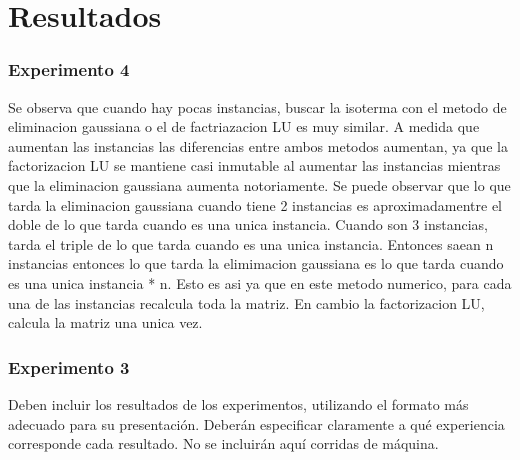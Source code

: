 \section{Resultados}
	
	
	


	\subsubsection*{Experimento 4}
	Se observa que cuando hay pocas instancias, buscar la isoterma con el metodo de eliminacion gaussiana o el de factriazacion LU es muy similar. A medida que aumentan las instancias las diferencias entre ambos metodos aumentan, ya que la factorizacion LU se mantiene casi inmutable al aumentar las instancias mientras que la eliminacion gaussiana aumenta notoriamente. Se puede observar que lo que tarda la eliminacion gaussiana cuando tiene 2 instancias es aproximadamentre el doble de lo que tarda cuando es una unica instancia. Cuando son 3 instancias, tarda el triple de lo que tarda cuando es una unica instancia. Entonces saean n instancias entonces lo que tarda la elimimacion gaussiana es lo que tarda cuando es una unica instancia * n. Esto es asi ya que en este metodo numerico, para cada una de las instancias recalcula toda la matriz. En cambio la factorizacion LU, calcula la matriz una unica vez.
  	
	\subsubsection*{Experimento 3}
	


  {\color{Gray} Deben incluir los resultados de los experimentos, utilizando el formato más adecuado para su presentación. Deberán especificar claramente a qué experiencia corresponde cada resultado. No se incluirán aquí corridas de máquina.}
